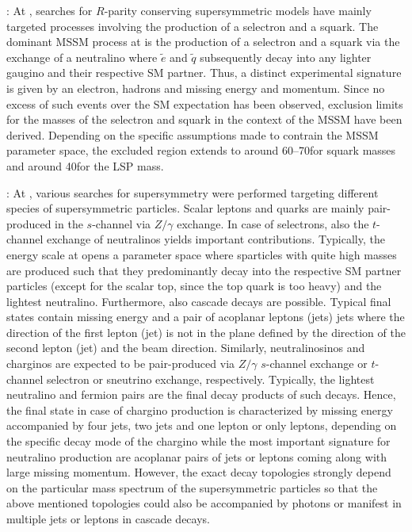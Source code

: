 \begin{description}
 \item \textbf{\hera \cite{Aid:1996es, Breitweg:1998gk}}: At \hera, searches for $R$-parity conserving supersymmetric models have mainly targeted processes involving the production of a selectron and a squark. The dominant MSSM process at \hera is the production of a selectron and a squark via the exchange of a neutralino where $\tilde{e}$ and $\tilde{q}$ subsequently decay into any lighter gaugino and their respective SM partner. Thus, a distinct experimental signature is given by an electron, hadrons and missing energy and momentum. Since no excess of such events over the SM expectation has been observed, exclusion limits for the masses of the selectron and squark in the context of the MSSM have been derived. Depending on the specific assumptions made to contrain the MSSM parameter space, the excluded region extends to around 60--70\gev for squark masses and around 40\gev for the LSP mass. 
 \item \textbf{\lep \cite{ALEPHSUSY, DELPHISUSY, L3SUSY, OPALSUSY, LEPLimits}}: At \lep, various searches for supersymmetry were performed targeting different species of supersymmetric particles. Scalar leptons and quarks are mainly pair-produced in the $s$-channel via $Z/\gamma$ exchange. In case of selectrons, also the $t$-channel exchange of neutralinos yields important contributions. Typically, the energy scale at \lep opens a parameter space where sparticles with quite high masses are produced such that they predominantly decay into the respective SM partner particles (except for the scalar top, since the top quark is too heavy) and the lightest neutralino. Furthermore, also cascade decays are possible. Typical final states contain missing energy and a pair of acoplanar leptons (jets) jets where the direction of the first lepton (jet) is not in the plane defined by the direction of the second lepton (jet) and the beam direction. Similarly, neutralinosinos and charginos are expected to be pair-produced via $Z/\gamma$ $s$-channel exchange or $t$-channel selectron or sneutrino exchange, respectively. Typically, the lightest neutralino and fermion pairs are the final decay products of such decays. Hence, the final state in case of chargino production is characterized by missing energy accompanied by four jets, two jets and one lepton or only leptons, depending on the specific decay mode of the chargino while the most important signature for neutralino production are acoplanar pairs of jets or leptons coming along with large missing momentum. However, the exact decay topologies strongly depend on the particular mass spectrum of the supersymmetric particles so that the above mentioned topologies could also be accompanied by photons or manifest in multiple jets or leptons in cascade decays. \\

\end{description}
